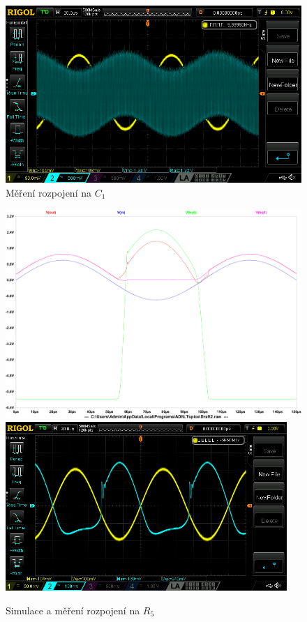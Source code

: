 \documentclass{article}
\begin{document}

\begin{figure}[H]
  \centering
  \includegraphics[width=\textwidth]{mereni/NewFile5.png}
  \caption{Měření rozpojení na \(C_1\)}
  \label{tran-porucha4}
\end{figure}


\begin{figure}[H]
  \centering
  \includegraphics[width=\textwidth]{sim/porucha-5/tran.pdf}
  \includegraphics[width=0.95\textwidth]{mereni/NewFile9.png}
  \caption{Simulace a měření rozpojení na \(R_5\)}
  \label{tran-porucha5}
\end{figure}
\end{document}
